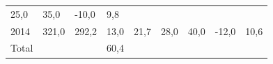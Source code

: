 \begin{longtable}[]{@{}lllllllll@{}}
\begin{minipage}[t]{0.07\columnwidth}
25,0\strut
\end{minipage} & \begin{minipage}[t]{0.07\columnwidth}\raggedright
35,0\strut
\end{minipage} & \begin{minipage}[t]{0.11\columnwidth}\raggedright
-10,0\strut
\end{minipage} & \begin{minipage}[t]{0.14\columnwidth}\raggedright
9,8\strut
\end{minipage}\tabularnewline
\begin{minipage}[t]{0.05\columnwidth}\raggedright
2014\strut
\end{minipage} & \begin{minipage}[t]{0.08\columnwidth}\raggedright
321,0\strut
\end{minipage} & \begin{minipage}[t]{0.05\columnwidth}\raggedright
292,2\strut
\end{minipage} & \begin{minipage}[t]{0.10\columnwidth}\raggedright
13,0\strut
\end{minipage} & \begin{minipage}[t]{0.10\columnwidth}\raggedright
21,7\strut
\end{minipage} & \begin{minipage}[t]{0.07\columnwidth}\raggedright
28,0\strut
\end{minipage} & \begin{minipage}[t]{0.07\columnwidth}\raggedright
40,0\strut
\end{minipage} & \begin{minipage}[t]{0.11\columnwidth}\raggedright
-12,0\strut
\end{minipage} & \begin{minipage}[t]{0.14\columnwidth}\raggedright
10,6\strut
\end{minipage}\tabularnewline
\begin{minipage}[t]{0.05\columnwidth}\raggedright
Total\strut
\end{minipage} & \begin{minipage}[t]{0.08\columnwidth}\raggedright
\strut
\end{minipage} & \begin{minipage}[t]{0.05\columnwidth}\raggedright
\strut
\end{minipage} & \begin{minipage}[t]{0.10\columnwidth}\raggedright
60,4\strut
\end{minipage} & \begin{minipage}[t]{0.10\columnwidth}\raggedright

\end{minipage}
\end{longtable}
